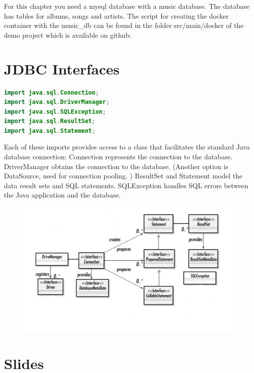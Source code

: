 For this chapter you need a mysql database with a music database. The database has tables for albums, songs and artists. The script for creating the docker container with the music\_db can be found in the folder src/main/docker of the demo project which is available on github:


\section{JDBC Interfaces}

\begin{lstlisting}[language=java,frame=single]
import java.sql.Connection;
import java.sql.DriverManager;
import java.sql.SQLException;
import java.sql.ResultSet;
import java.sql.Statement;
\end{lstlisting}

Each of these imports provides access to a class that facilitates the standard Java database connection:
Connection represents the connection to the database.
DriverManager obtains the connection to the database. (Another option is DataSource, used for connection pooling. )
ResultSet and Statement model the data result sets and SQL statements.
SQLException handles SQL errors between the Java application and the database.


\begin{figure}[t]
\includegraphics[width=\textwidth]{./images/chapter4/jdbc_diagram.png}
\centering
\end{figure}

\section{Slides}

% 